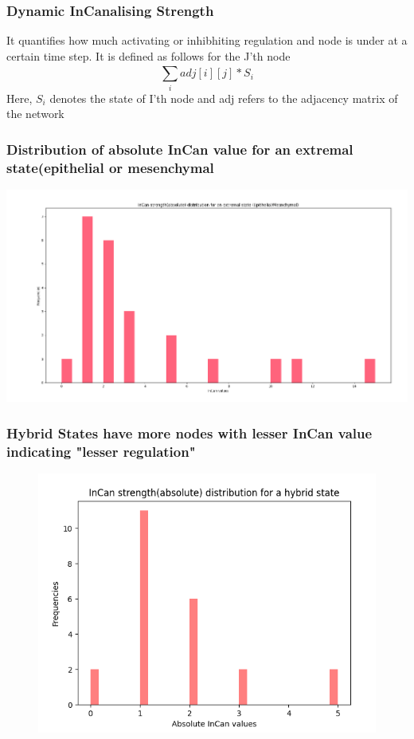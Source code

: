 \documentclass[t]{beamer}
\begin{document}
\begin{frame}
	\frametitle{Dynamic InCanalising Strength}

	It quantifies how much activating or inhibhiting regulation and node is under at a certain time step. It is defined as follows for the J'th node
\[   \sum_{ i } ^ { } adj[i][j] * S_i                    \]
Here, $ S_i $ denotes the state of I'th node and adj refers to the adjacency matrix of the network 
\end{frame}

\begin{frame}
	\frametitle{Distribution of absolute InCan value for an extremal state(epithelial or mesenchymal}

	\includegraphics[scale=0.17]{img/incan_epi_emtracipe2.png}
	\end{frame}

\begin{frame}
	\frametitle{Hybrid States have more nodes with lesser InCan value indicating "lesser regulation"}
\begin{figure}[H]
	\includegraphics[scale=0.25]{img/hybrid_incan_emtracipe2.png}
	\end{figure}
\end{frame}
\end{document}
